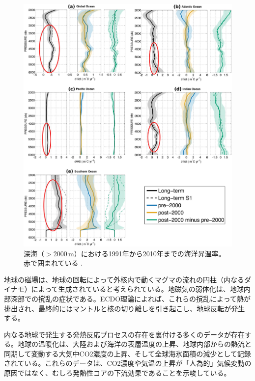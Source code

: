 \documentclass[10pt,twocolumn,letterpaper]{article}
\begin{document}
\begin{figure}[t]
\begin{center}
   \includegraphics[width=1\linewidth]{ocean-highlight.jpg}
\end{center}
   \caption{深海（$>$2000\,m）における1991年から2010年までの海洋昇温率。赤で囲まれている \cite{132}.}
\label{fig:15}
\label{fig:onecol}
\end{figure}

地球の磁場は、地球の回転によって外核内で動くマグマの流れの円柱（内なるダイナモ）によって生成されていると考えられている\cite{123}。地磁気の弱体化は、地球内部深部での撹乱の症状である。ECDO理論によれば、これらの撹乱によって熱が排出され、最終的にはマントルと核の切り離しを引き起こし、地球反転が発生する\cite{1}。

内なる地球で発生する発熱反応プロセスの存在を裏付ける多くのデータが存在する。地球の温暖化は、大陸および海洋の表層温度の上昇\cite{127,128}、地球内部からの熱流と同期して変動する大気中CO2濃度の上昇\cite{129,130}、そして全球海氷面積の減少\cite{131}として記録されている。これらのデータは、CO2濃度や気温の上昇が「人為的」気候変動の原因ではなく、むしろ発熱性コアの下流効果であることを示唆している\cite{129}。
\end{document}
